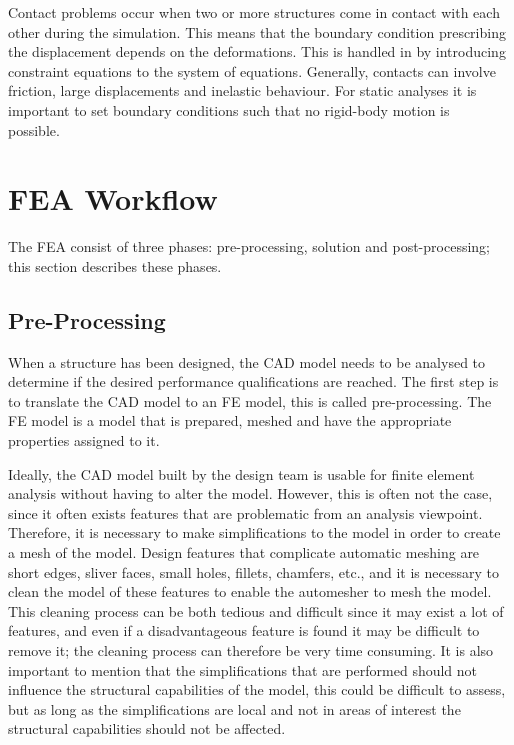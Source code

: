 Contact problems occur when two or more structures come in contact with each other during the simulation. This means that the boundary condition prescribing the displacement depends on the deformations. This is handled in by introducing constraint equations to the system of equations. Generally, contacts can involve friction, large displacements and inelastic behaviour. For static analyses it is important to set boundary conditions such that no rigid-body motion is possible.~\cite[p.~549ff.]{bhatti06}


\section{FEA Workflow} %
\label{sec:fea_workflow}
The FEA consist of three phases: pre-processing, solution and post-processing; this section describes these phases.

\subsection{Pre-Processing} %
\label{sub:pre_processing}
When a structure has been designed, the CAD model needs to be analysed to determine if the desired performance qualifications are reached. The first step is to translate the CAD model to an FE model, this is called pre-processing. The FE model is a model that is prepared, meshed and have the appropriate properties assigned to it.

Ideally, the CAD model built by the design team is usable for finite element analysis without having to alter the model. However, this is often not the case, since it often exists features that are problematic from an analysis viewpoint. Therefore, it is necessary to make simplifications to the model in order to create a mesh of the model. Design features that complicate automatic meshing are short edges, sliver faces, small holes, fillets, chamfers, etc., and it is necessary to clean the model of these features to enable the automesher to mesh the model. This cleaning process can be both tedious and difficult since it may exist a lot of features, and even if a disadvantageous feature is found it may be difficult to remove it; the cleaning process can therefore be very time consuming. It is also important to mention that the simplifications that are performed should not influence the structural capabilities of the model, this could be difficult to assess, but as long as the simplifications are local and not in areas of interest the structural capabilities should not be affected.~\cite[p.~181--191]{adams99}

